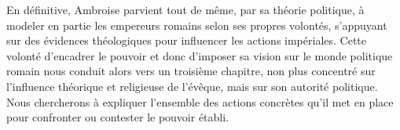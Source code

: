 \bigskip

En définitive, Ambroise parvient tout de même, par sa théorie politique, à modeler en partie les empereurs romains selon ses propres volontés, s'appuyant sur des évidences théologiques pour influencer les actions impériales. Cette volonté d'encadrer le pouvoir et donc d'imposer sa vision sur le monde politique romain nous conduit alors vers un troisième chapitre, non plus concentré sur l'influence théorique et religieuse de l'évêque, mais sur son autorité politique. Nous chercherons à expliquer l’ensemble des actions concrètes qu'il met en place pour confronter ou contester le pouvoir établi.
